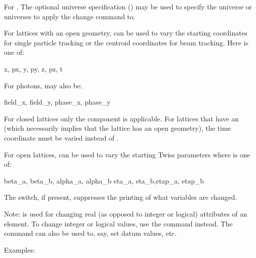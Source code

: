 For , The optional 
universe specification () may be used to specify the
universe or universes to apply the change command to.

For lattices with an open geometry,  
can be used to vary the starting coordinates for single particle tracking or the
centroid coordinates for beam tracking. Here  is one of: 
\begin{example}
  x, px, y, py, z, pz, t
\end{example}
For photons,  may also be:
\begin{example}
  field_x, field_y, phase_x, phase_y
\end{example}
For closed lattices only the  component is applicable. For
lattices that have an  (which necessarily implies that the
lattice has an open geometry), the time  coordinate must be
varied instead of .

For open lattices,  can be used to
vary the starting Twiss parameters where  is one of:  
\begin{example}
  beta_a, beta_b, alpha_a, alpha_b 
  eta_a, eta_b,etap_a, etap_b    
\end{example}

The  switch, if present, suppresses the printing of what
variables are changed.

Note:  is used for changing real (as opposed to
integer or logical) attributes of an element. To change integer or
logical values, use the  command instead. The 
command can also be used to, say, set datum values, etc.

Examples:


